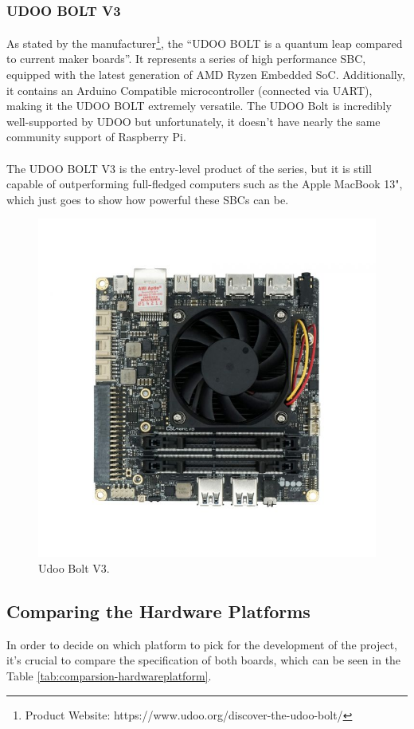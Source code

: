 \subsubsection{UDOO BOLT V3}

As stated by the manufacturer\footnote{Product Website: https://www.udoo.org/discover-the-udoo-bolt/}, the ``UDOO BOLT is a quantum leap compared to current maker boards''. It represents a series of high performance \acs{SBC}, equipped with the latest generation of AMD Ryzen Embedded SoC. Additionally, it contains an Arduino Compatible microcontroller (connected via UART), making it the UDOO BOLT extremely versatile.
The UDOO Bolt is incredibly well-supported by UDOO but unfortunately, it doesn't have nearly the same community support of Raspberry Pi.

\paragraph{} The UDOO BOLT V3 is the entry-level product of the series, but it is still capable of outperforming full-fledged computers such as the Apple MacBook 13", which just goes to show how powerful these \acs{SBC}s can be.

\begin{figure}[H]
    \centering
    \includegraphics[width=0.45\linewidth]{images/udoobolt-image.jpg}
    \caption{Udoo Bolt V3.}
    \label{fig:udoobolt-image}
\end{figure}

\subsection{Comparing the Hardware Platforms}

In order to decide on which platform to pick for the development of the project, it's crucial to compare the specification of both boards, which can be seen in the Table \ref{tab:comparsion-hardwareplatform}.

